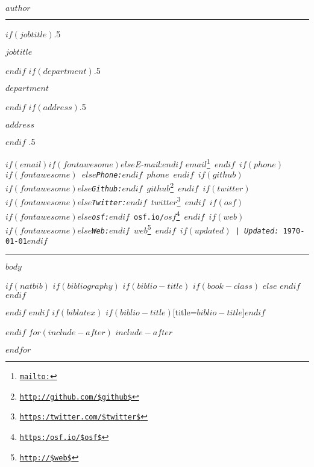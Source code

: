\documentclass[$if(fontsize)$$fontsize$,$endif$$if(lang)$$babel-lang$,$endif$$if(papersize)$$papersize$paper,$endif$$for(classoption)$$classoption$$sep$,$endfor$]{$documentclass$}
\renewcommand{\href}[2]{#2\footnote{\url{#1}}}
\begin{document}
\centerline{\huge \bf $author$}

\vspace{2 mm}

\hrule

\vspace{2 mm}

$if(jobtitle)$\moveleft.5\hoffset\centerline{$jobtitle$}$endif$
$if(department)$\moveleft.5\hoffset\centerline{$department$}$endif$
$if(address)$\moveleft.5\hoffset\centerline{$address$}$endif$
\moveleft.5\hoffset\centerline{ $if(email)$$if(fontawesome)$\faEnvelopeO \hspace{1 mm}$else$\emph{E-mail:}$endif$ \href{mailto:}{\tt $email$} \hspace{1 mm}$endif$ $if(phone)$$if(fontawesome)$ \faPhone \hspace{1 mm}$else$\emph{Phone:}$endif$  $phone$  \hspace{1 mm} $endif$ $if(github)$$if(fontawesome)$\faGithub \hspace{1 mm}$else$\emph{Github:}$endif$ \href{http://github.com/$github$}{\tt $github$} \hspace{1 mm} $endif$  $if(twitter)$$if(fontawesome)$\faTwitter \hspace{1 mm}$else$\emph{Twitter:}$endif$ \href{https:/twitter.com/$twitter$}{\tt $twitter$} \hspace{1 mm} $endif$ $if(osf)$$if(fontawesome)$\faUnlock \hspace{1 mm}$else$\emph{osf:}$endif$ \href{https:/osf.io/$osf$}{\tt osf.io/$osf$} \hspace{1 mm} $endif$ $if(web)$$if(fontawesome)$\faGlobe \hspace{1 mm}$else$\emph{Web:}$endif$ \href{http://$web$}{\tt $web$}  $endif$ $if(updated)$ | \emph{Updated:} \apstylekinda\today$endif$} 

\vspace{2 mm}

\hrule


$body$

$if(natbib)$
$if(bibliography)$
$if(biblio-title)$
$if(book-class)$
\renewcommand\bibname{$biblio-title$}
$else$
\renewcommand\refname{$biblio-title$}
$endif$
$endif$


$endif$
$endif$
$if(biblatex)$
\printbibliography$if(biblio-title)$[title=$biblio-title$]$endif$

$endif$
$for(include-after)$
$include-after$

$endfor$
\end{document}
